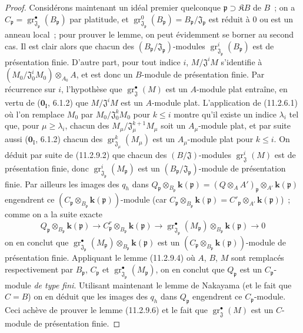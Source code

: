 \begin{proof}
Considérons maintenant un idéal premier quelconque
$\mathfrak p\supset\mathfrak KB$ de $B$~; on a
$C_\mathfrak p=\operatorname{gr}_{\mathfrak J_\mathfrak p}^\bullet(B_\mathfrak p)$
par platitude, et
$\operatorname{gr}_{\mathfrak J_\mathfrak p}^0(B_\mathfrak p)
=B_\mathfrak p/\mathfrak J_\mathfrak p$ est réduit à 0 ou est un anneau
local~; pour prouver le lemme, on peut évidemment se borner au second cas. Il
est clair alors que chacun des $(B_\mathfrak p/\mathfrak J_\mathfrak p)$-modules
$\operatorname{gr}_{\mathfrak J_\mathfrak p}^i(B_\mathfrak p)$ est de
présentation finie. D'autre part, pour tout indice $i$,
$M/\mathfrak J^iM$ s'identifie à
$(M_0/\mathfrak J_0^iM_0)\otimes_{A_0}A$, et est donc un $B$-module de
présentation finie. Par récurrence sur $i$, l'hypothèse que
$\operatorname{gr}_{\mathfrak J}^\bullet(M)$ est un $A$-module plat entraîne, en
vertu de ($\mathbf 0_{\mathrm I}$, 6.1.2) que $M/\mathfrak J^iM$ est un
$A$-module plat. L'application de (11.2.6.1) où l'on remplace $M_0$ par
$M_0/\mathfrak J_0^kM_0$ pour $k\leq i$ montre qu'il existe un indice
$\lambda_i$ tel que, pour $\mu\geq\lambda_i$, chacun des
$M_\mu/\mathfrak J_\mu^{k+1}M_\mu$ soit un $A_\mu$-module plat, et par suite
aussi ($\mathbf 0_{\mathrm I}$, 6.1.2) chacun des
$\operatorname{gr}_{\mathfrak J_\mu}^k(M_\mu)$ est un $A_\mu$-module plat
pour $k\leq i$. On déduit par suite de (11.2.9.2) que chacun des
$(B/\mathfrak J)$-modules $\operatorname{gr}_{\mathfrak J}^i(M)$ est de
présentation finie, donc
$\operatorname{gr}_{\mathfrak J_\mathfrak p}^i(M_\mathfrak p)$ est un
$(B_\mathfrak p/\mathfrak J_\mathfrak p)$-module de présentation finie. Par
ailleurs les images des $q_h$ dans
$Q_\mathfrak p\otimes_{B_\mathfrak p}\boldsymbol{k}(\mathfrak p)
=(Q\otimes_AA')_\mathfrak p\otimes_{A'}\boldsymbol{k}(\mathfrak p)$
engendrent ce
$(C_\mathfrak p\otimes_{B_\mathfrak p}\boldsymbol{k}(\mathfrak p))$-module
(car $C_\mathfrak p\otimes_{B_\mathfrak p}\boldsymbol{k}(\mathfrak p)
=C'_\mathfrak p\otimes_{A'}\boldsymbol{k}(\mathfrak p)$)~;
comme on a la suite exacte
\[
Q_\mathfrak p\otimes_{B_\mathfrak p}\boldsymbol{k}(\mathfrak p)
\longrightarrow C_\mathfrak p^{r}\otimes_{B_\mathfrak p}\boldsymbol{k}(\mathfrak p)
\longrightarrow
\operatorname{gr}_{\mathfrak J_\mathfrak p}^\bullet(M_\mathfrak p)
\otimes_{B_\mathfrak p}\boldsymbol{k}(\mathfrak p)\longrightarrow0
\]
on en conclut que
$\operatorname{gr}_{\mathfrak J_\mathfrak p}^\bullet(M_\mathfrak p)
\otimes_{B_\mathfrak p}\boldsymbol{k}(\mathfrak p)$ est un
$(C_\mathfrak p\otimes_{B_\mathfrak p}\boldsymbol{k}(\mathfrak p))$-module de présentation
finie. Appliquant le lemme (11.2.9.4) où $A$, $B$, $M$ sont remplacés
respectivement par $B_\mathfrak p$, $C_\mathfrak p$ et
$\operatorname{gr}_{\mathfrak J_\mathfrak p}^\bullet(M_\mathfrak p)$, on en conclut
que $Q_\mathfrak p$ est un $C_\mathfrak p$-module \emph{de type fini}. Utilisant
maintenant le lemme de Nakayama (et le fait que $C=B$) on en déduit que les
images des $q_h$ dans $Q_\mathfrak p$ engendrent ce $C_\mathfrak p$-module.
Ceci achève de prouver le lemme (11.2.9.6) et le fait que
$\operatorname{gr}_{\mathfrak J}^\bullet(M)$ est un $C$-module de présentation
finie.


\end{proof}
